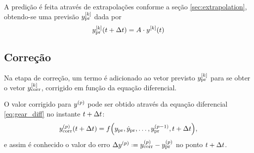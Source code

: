 A predição é feita através de extrapolações conforme a seção \ref{sec:extrapolation}, obtendo-se uma previsão \(\drvec{\taylorOrder}{\predicted{y}}\) dada por
\[\drvec{\taylorOrder}{\predicted{y}}\pqty{t+\Dt} = A\cdot\drvec{\taylorOrder}{y}\pqty{t}\]

\subsection{Correção}

Na etapa de correção, um termo é adicionado ao vetor previsto \(\drvec{\taylorOrder}{\predicted{y}}\) para se obter o vetor \(\drvec{\taylorOrder}{\corrected{y}}\), corrigido em função da equação diferencial.

O valor corrigido para \(\deriv{\eqOrder}{y}\) pode ser obtido através da equação diferencial \eqref{eq:gear_diff} no instante \(t+\Delta t\):
\[
	\corrected{\deriv{\eqOrder}{y}}\pqty{t+\Dt} = f\pqty{\predicted{y}, \predicted{\deriv{1}{y}},\dots,\predicted{\deriv{\eqOrder-1}{y}}, t+\Dt},
\]
e assim é conhecido o valor do erro \(\Delta \deriv{\eqOrder}{y} \eqdef \corrected{\deriv{\eqOrder}{y}} - \predicted{\deriv{\eqOrder}{y}}\) no ponto \(t+\Delta t\).

